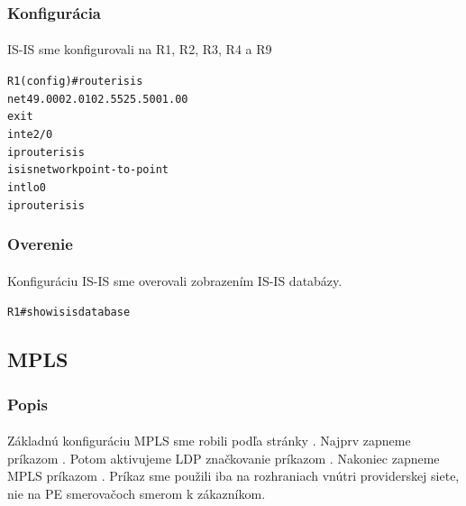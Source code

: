 \documentclass[12pt,twoside,a4paper]{report}
\begin{document}
\subsubsection{Konfigurácia}
\paragraph{}
IS-IS sme konfigurovali na R1, R2, R3, R4 a R9

\noindent
{\selectfont
\begin{small}
\begin{alltt}
R1(config)#router isis
  net 49.0002.0102.5525.5001.00
  exit
int e2/0
  ip router isis
  isis network point-to-point
int lo0
  ip router isis
\end{alltt}
\end{small}
}

\subsubsection{Overenie}
\paragraph{}
Konfiguráciu IS-IS sme overovali zobrazením IS-IS databázy.

\noindent
{\selectfont
\begin{small}
\begin{alltt}
R1# show isis database
\end{alltt}
\end{small}
}







\subsection{MPLS}
\subsubsection{Popis}
\paragraph{}
Základnú konfiguráciu MPLS sme robili podľa stránky . Najprv zapneme  príkazom . Potom aktivujeme LDP značkovanie príkazom . Nakoniec zapneme MPLS príkazom . Príkaz  sme použili iba na rozhraniach vnútri providerskej siete, nie na PE smerovačoch smerom k zákazníkom.
\end{document}
